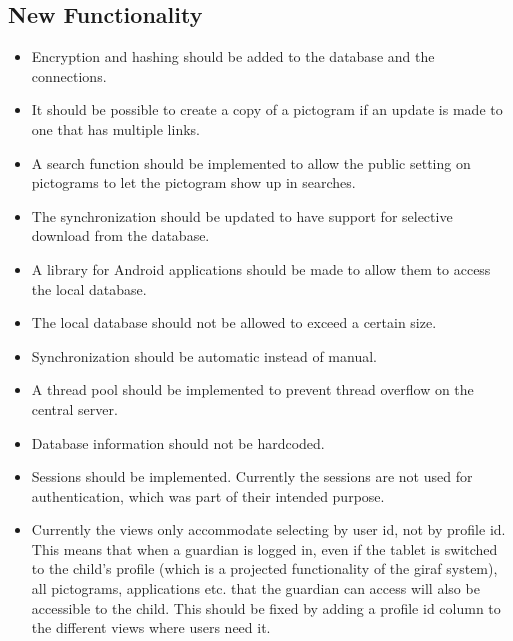 \subsection{New Functionality}
\begin{itemize}
\item Encryption and hashing should be added to the database and the connections.
\item It should be possible to create a copy of a pictogram if an update is made to one that has multiple links.
\item A search function should be implemented to allow the public setting on pictograms to let the pictogram show up in searches.
\item The synchronization should be updated to have support for selective download from the database.
\item A library for Android applications should be made to allow them to access the local database.
\item The local database should not be allowed to exceed a certain size.
\item Synchronization should be automatic instead of manual.
\item A thread pool should be implemented to prevent thread overflow on the central server.
\item Database information should not be hardcoded.
\item Sessions should be implemented. Currently the sessions are not used for authentication, which was part of their intended purpose.
\item Currently the views only accommodate selecting by user id, not by profile id. This means that when a guardian is logged in, even if the tablet is switched to the child's profile (which is a projected functionality of the \ac{giraf} system), all pictograms, applications etc. that the guardian can access will also be accessible to the child. This should be fixed by adding a profile id column to the different views where users need it.
\end{itemize}